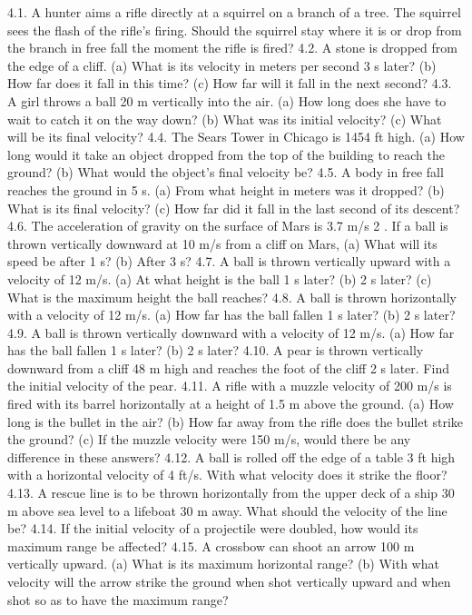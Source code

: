4.1. A hunter aims a rifle directly at a squirrel on a branch of a tree. The squirrel sees the flash of the rifle’s firing. Should
the squirrel stay where it is or drop from the branch in free fall the moment the rifle is fired?
4.2. A stone is dropped from the edge of a cliff. (a) What is its velocity in meters per second 3 s later? (b) How far does it
fall in this time? (c) How far will it fall in the next second?
4.3. A girl throws a ball 20 m vertically into the air. (a) How long does she have to wait to catch it on the way down?
(b) What was its initial velocity? (c) What will be its final velocity?
4.4. The Sears Tower in Chicago is 1454 ft high. (a) How long would it take an object dropped from the top of the building
to reach the ground? (b) What would the object’s final velocity be?
4.5. A body in free fall reaches the ground in 5 s. (a) From what height in meters was it dropped? (b) What is its final
velocity? (c) How far did it fall in the last second of its descent?
4.6. The acceleration of gravity on the surface of Mars is 3.7 m/s 2 . If a ball is thrown vertically downward at 10 m/s from
a cliff on Mars, (a) What will its speed be after 1 s? (b) After 3 s?
4.7. A ball is thrown vertically upward with a velocity of 12 m/s. (a) At what height is the ball 1 s later? (b) 2 s later?
(c) What is the maximum height the ball reaches?
4.8. A ball is thrown horizontally with a velocity of 12 m/s. (a) How far has the ball fallen 1 s later? (b) 2 s later?
4.9. A ball is thrown vertically downward with a velocity of 12 m/s. (a) How far has the ball fallen 1 s later? (b) 2 s later?
4.10. A pear is thrown vertically downward from a cliff 48 m high and reaches the foot of the cliff 2 s later. Find the initial
velocity of the pear.
4.11. A rifle with a muzzle velocity of 200 m/s is fired with its barrel horizontally at a height of 1.5 m above the ground. (a)
How long is the bullet in the air? (b) How far away from the rifle does the bullet strike the ground? (c) If the muzzle
velocity were 150 m/s, would there be any difference in these answers?
4.12. A ball is rolled off the edge of a table 3 ft high with a horizontal velocity of 4 ft/s. With what velocity does it strike
the floor?
4.13. A rescue line is to be thrown horizontally from the upper deck of a ship 30 m above sea level to a lifeboat 30 m away.
What should the velocity of the line be?
4.14. If the initial velocity of a projectile were doubled, how would its maximum range be affected?
4.15. A crossbow can shoot an arrow 100 m vertically upward. (a) What is its maximum horizontal range? (b) With what
velocity will the arrow strike the ground when shot vertically upward and when shot so as to have the maximum range?


